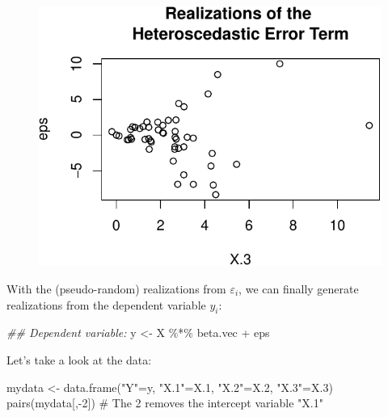 \documentclass[
  letterpaper,
  DIV=11,
  numbers=noendperiod]{scrreprt}
\newenvironment{Shaded}{\begin{snugshade}}{\end{snugshade}}
\newcommand{\CommentTok}[1]{\textcolor[rgb]{0.37,0.37,0.37}{#1}}
\newcommand{\DecValTok}[1]{\textcolor[rgb]{0.68,0.00,0.00}{#1}}
\newcommand{\DocumentationTok}[1]{\textcolor[rgb]{0.37,0.37,0.37}{\textit{#1}}}
\newcommand{\FloatTok}[1]{\textcolor[rgb]{0.68,0.00,0.00}{#1}}
\newcommand{\FunctionTok}[1]{\textcolor[rgb]{0.28,0.35,0.67}{#1}}
\newcommand{\NormalTok}[1]{\textcolor[rgb]{0.00,0.23,0.31}{#1}}
\newcommand{\OtherTok}[1]{\textcolor[rgb]{0.00,0.23,0.31}{#1}}
\newcommand{\SpecialCharTok}[1]{\textcolor[rgb]{0.37,0.37,0.37}{#1}}
\newcommand{\StringTok}[1]{\textcolor[rgb]{0.13,0.47,0.30}{#1}}
\theoremstyle{definition}
\theoremstyle{plain}
\theoremstyle{plain}
\theoremstyle{remark}
\begin{document}
\begin{figure}[H]

{\centering \includegraphics{./01-Introduction-to-R_files/figure-pdf/unnamed-chunk-27-1.pdf}

}

\end{figure}

With the (pseudo-random) realizations from \(\varepsilon_i\), we can
finally generate realizations from the dependent variable \(y_i\):

\begin{Shaded}
\begin{Highlighting}[]
\DocumentationTok{\#\# Dependent variable:}
\NormalTok{y   }\OtherTok{\textless{}{-}}\NormalTok{ X }\SpecialCharTok{\%*\%}\NormalTok{ beta.vec }\SpecialCharTok{+}\NormalTok{ eps}
\end{Highlighting}
\end{Shaded}

Let's take a look at the data:

\begin{Shaded}
\begin{Highlighting}[]
\NormalTok{mydata    }\OtherTok{\textless{}{-}} \FunctionTok{data.frame}\NormalTok{(}\StringTok{"Y"}\OtherTok{=}\NormalTok{y, }\StringTok{"X.1"}\OtherTok{=}\NormalTok{X}\FloatTok{.1}\NormalTok{, }\StringTok{"X.2"}\OtherTok{=}\NormalTok{X}\FloatTok{.2}\NormalTok{, }\StringTok{"X.3"}\OtherTok{=}\NormalTok{X}\FloatTok{.3}\NormalTok{)}
\FunctionTok{pairs}\NormalTok{(mydata[,}\SpecialCharTok{{-}}\DecValTok{2}\NormalTok{]) }\CommentTok{\# The \textquotesingle{}{-}2\textquotesingle{} removes the intercept variable "X.1"}
\end{Highlighting}
\end{Shaded}
\end{document}
